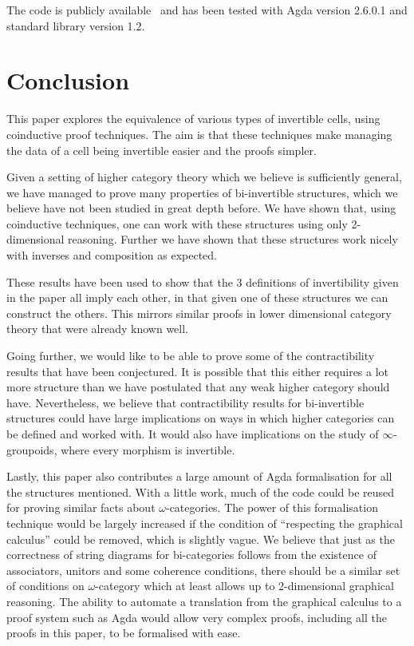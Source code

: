 \documentclass[draft]{article}
\theoremstyle{definition} \newtheorem{definition}{Definition}
\theoremstyle{remark} \newtheorem{remark}{Remark}
\begin{document}
The code is publicly available~\cite{rice_agda} and has been tested
with Agda version 2.6.0.1 and standard library version
1.2.

\section{Conclusion}\label{sec:conclusion}

This paper explores the equivalence of various types of invertible
cells, using coinductive proof techniques. The aim is that these
techniques make managing the data of a cell being invertible easier
and the proofs simpler.

Given a setting of higher category theory which we believe is
sufficiently general, we have managed to prove many properties of
bi-invertible structures, which we believe have not been studied in
great depth before. We have shown that, using coinductive techniques,
one can work with these structures using only 2-dimensional reasoning.
Further we have shown that these structures work nicely with inverses
and composition as expected.

These results have been used to show that the 3 definitions of
invertibility given in the paper all imply each other, in that given
one of these structures we can construct the others. This mirrors
similar proofs in lower dimensional category theory that were already
known well.

Going further, we would like to be able to prove some of the
contractibility results that have been conjectured. It is possible
that this either requires a lot more structure than we have postulated
that any weak higher category should have. Nevertheless, we believe
that contractibility results for bi-invertible structures could have
large implications on ways in which higher categories can be defined
and worked with. It would also have implications on the study of
\(\infty\)-groupoids, where every morphism is invertible.

Lastly, this paper also contributes a large amount of Agda
formalisation for all the structures mentioned. With a little work,
much of the code could be reused for proving similar facts about
\(\omega\)-categories. The power of this formalisation technique would
be largely increased if the condition of ``respecting the graphical
calculus'' could be removed, which is slightly vague. We believe that
just as the correctness of string diagrams for bi-categories follows
from the existence of associators, unitors and some coherence
conditions, there should be a similar set of conditions on
\(\omega\)-category which at least allows up to 2-dimensional
graphical reasoning. The ability to automate a translation from the
graphical calculus to a proof system such as Agda would allow very
complex proofs, including all the proofs in this paper, to be
formalised with ease.

\printbibliography{}
\end{document}

